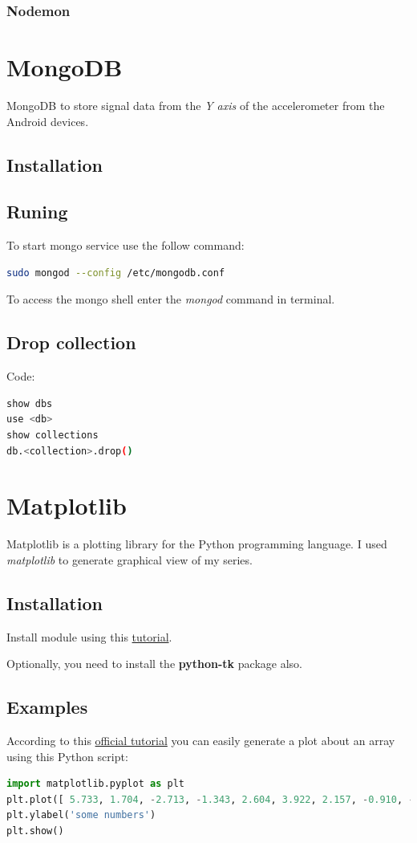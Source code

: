 \documentclass[12pt, a4paper, portrait]{article}
\begin{document}
\subsubsection{Nodemon}

\pagebreak
\section{MongoDB}
MongoDB to store signal data from the \textit{Y axis} of the accelerometer from the Android devices.
\subsection{Installation}
\subsection{Runing}
To start mongo service use the follow command:
\begin{lstlisting}[language=bash]
sudo mongod --config /etc/mongodb.conf 
\end{lstlisting}
To access the mongo shell enter the \textit{mongod} command in terminal.
\subsection{Drop collection}
Code:
\begin{lstlisting}[language=bash, caption=MongoDB shell commands to drop a collection]
show dbs
use <db>
show collections
db.<collection>.drop()
\end{lstlisting}

\pagebreak
\section{Matplotlib}
Matplotlib is a plotting library for the Python programming language.
I used \textit{matplotlib} to generate graphical view of my series.
\subsection{Installation}
Install module using this \href{https://matplotlib.org/users/installing.html#linux-using-your-package-manager}{tutorial}.
\par Optionally, you need to install the \textbf{python-tk} package also.
\subsection{Examples}
According to this \href{https://matplotlib.org/users/pyplot_tutorial.html}{official tutorial} you can easily generate a plot about an array using this Python script:
\begin{lstlisting}[language=Python]
import matplotlib.pyplot as plt
plt.plot([ 5.733, 1.704, -2.713, -1.343, 2.604, 3.922, 2.157, -0.910, -2.414, -2.943, -1.526, -0.823])
plt.ylabel('some numbers')
plt.show()
\end{lstlisting}
\end{document}
